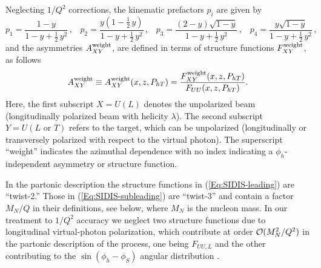 \documentclass[a4paper,11pt]{article}
\newcommand{\be}{\begin{equation}}
\newcommand{\ee}{\end{equation}}
\newcommand{\ba}{\begin{eqnarray}}
\newcommand{\ea}{\end{eqnarray}}
\newcommand{\slim}{\mskip 1.5mu}       %
\newcommand{\bp}[1]{{\color[rgb]{0,0.65,0.35}#1}}
\def\Phperp{P_{hT}}
\begin{document}
Neglecting $1/Q^2$ corrections, the kinematic prefactors $p_i$ are given by
\be\label{Eq:y-prefactors}
	p_1 = \frac{1-y}{1-y+\frac12\,y^2} 		\, , \;\;\;
	p_2 = \frac{y(1-\frac12\,y)}{1-y+\frac12\,y^2}	\, , \;\;\;
	p_3 = \frac{(2-y)\sqrt{1-y}}{1-y+\frac12\,y^2} 	\, , \;\;\;
	p_4 = \frac{y\sqrt{1-y}}{1-y+\frac12\,y^2}     	\, ,
\ee
and the asymmetries {$A_{XY}^{\rm weight}$,  are defined in terms of
structure functions $F_{XY}^{\rm weight}$, as follows}
\be
	A_{XY}^{\rm weight}\equiv A_{XY}^{\rm weight}(x,z,\Phperp)=
	\frac{F_{XY}^{\rm weight}(x,z,\Phperp)}{F_{UU}(x,z,\Phperp)}.
\ee
Here, the first subscript $X=U(L)$ denotes the unpolarized beam
(longitudinally polarized beam with helicity $\lambda$). The second
subscript $Y=U(L\text{ or }T)$ refers to the target, which can be unpolarized
(longitudinally or transversely polarized with respect to the virtual photon).
The superscript ``weight'' indicates the azimuthal dependence with no index
indicating \bp{a $\phi_h$-independent asymmetry or structure function.} 

In the partonic description the structure functions in
(\ref{Eq:SIDIS-leading})    are ``twist-2.'' Those in
(\ref{Eq:SIDIS-subleading}) are ``twist-3'' and contain a
factor $M_N/Q$ in their definitions, see below,
where $M_N$ is the nucleon mass. In our treatment to $1/Q^2$
accuracy we neglect two structure functions due to longitudinal virtual-photon
polarization, which contribute at order ${\cal O}(M_N^2/Q^2)$ in the
partonic description of the process, one being $F_{UU,L}$ and the other
contributing to the $\sin(\phi_h-\phi_S)$ angular distribution
\cite{Bacchetta:2006tn}.
\end{document}
